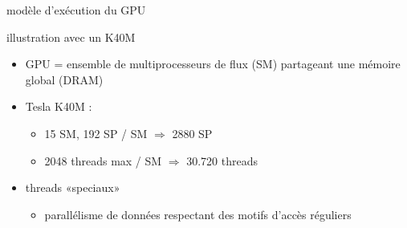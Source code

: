 \documentclass[11pt,mathserif]{beamer}
\begin{document}
\begin{frame}{modèle d'exécution du GPU}
  \begin{flushright}
   illustration avec un K40M
  \end{flushright}
\begin{minipage}[c]{0.49\linewidth}
  \begin{itemize}[<+->]
    \item GPU = ensemble de multiprocesseurs de flux (SM) partageant une mémoire global (DRAM)
    \item Tesla K40M : 
      \begin{itemize}
        \item 15 SM, 192 SP / SM $\Rightarrow$ 2880 SP
        \item 2048 threads max / SM $\Rightarrow$ 30.720 threads
      \end{itemize}
    \item threads «speciaux»
      \begin{itemize}
        \item parallélisme de données respectant des motifs d'accès réguliers
      \end{itemize}
  \end{itemize}
\end{minipage}
\begin{minipage}[c]{0.49\linewidth}
\begin{center}
\end{center}
\end{minipage}
\end{frame}
\end{document}
